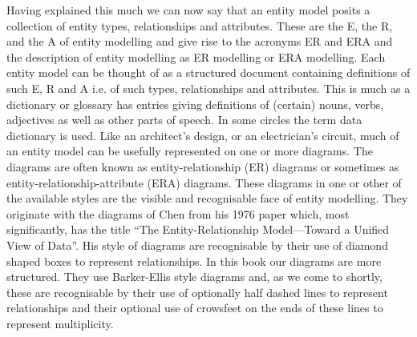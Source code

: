 \mynote Having explained this much we can now say that an entity model posits a collection of entity types, relationships and attributes. These are the E, the R, and the A of entity modelling and give rise to the acronyms ER and ERA and the description of entity modelling as ER modelling or ERA modelling.
Each entity model can be thought of as a structured document containing definitions of such  
E, R and A i.e. of such types, relationships and attributes. This is much  as a dictionary or glossary has entries giving definitions of (certain) nouns, verbs, adjectives as well as other parts of speech. In some circles the term data dictionary is used. Like an architect's design, or an electrician's circuit, much of an entity model can be usefully represented on one or more diagrams. The diagrams are often known as entity-relationship (ER) diagrams or sometimes as  entity-relationship-attribute (ERA) diagrams. 
These diagrams in one or other of the available styles are the visible and recognisable face of entity modelling. They originate with the diagrams of Chen from his 1976 paper which, most significantly, has the title ``The Entity-Relationship Model---Toward a Unified View of Data''. His style of diagrams are recognisable by their use of diamond shaped boxes to represent relationships. In this book our diagrams are more structured. They use Barker-Ellis style diagrams and, as we come to shortly, these are recognisable by their use of optionally half dashed lines to represent relationships and their optional use of crowsfeet on the ends of these lines to represent multiplicity. 

